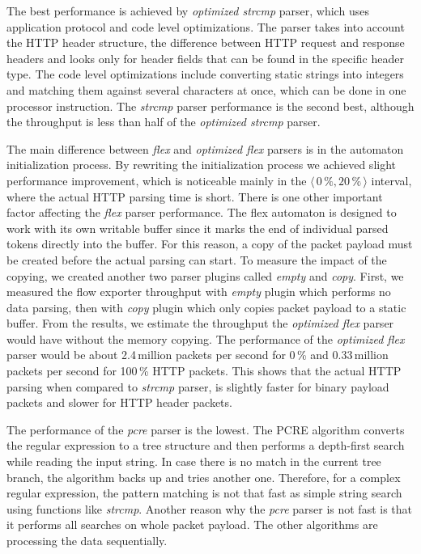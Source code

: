The best performance is achieved by \emph{optimized strcmp} parser, which uses application protocol and code level optimizations. The parser takes into account the HTTP header structure, the difference between HTTP request and response headers and looks only for header fields that can be found in the specific header type. The code level optimizations include converting static strings into integers and matching them against several characters at once, which can be done in one processor instruction. The \emph{strcmp} parser performance is the second best, although the throughput is less than half of the \emph{optimized strcmp} parser.

The main difference between \emph{flex} and \emph{optimized flex} parsers is in the automaton initialization process. By rewriting the initialization process we achieved slight performance improvement, which is noticeable mainly in the $\langle\,0\,\%,20\,\%\,\rangle$ interval, where the actual HTTP parsing time is short. There is one other important factor affecting the \emph{flex} parser performance. The flex automaton is designed to work with its own writable buffer since it marks the end of individual parsed tokens directly into the buffer. For this reason, a copy of the packet payload must be created before the actual parsing can start. To measure the impact of the copying, we created another two parser plugins called \emph{empty} and \emph{copy}. First, we measured the flow exporter throughput with \emph{empty} plugin which performs no data parsing, then with \emph{copy} plugin which only copies packet payload to a static buffer. From the results, we estimate the throughput the \emph{optimized flex} parser would have without the memory copying. The performance of the \emph{optimized flex} parser would be about 2.4\,million packets per second for 0\,\% and 0.33\,million packets per second for 100\,\% HTTP packets. This shows that the actual HTTP parsing when compared to \emph{strcmp} parser, is slightly faster for binary payload packets and slower for HTTP header packets.

The performance of the \emph{pcre} parser is the lowest. The PCRE algorithm converts the regular expression to a tree structure and then performs a depth-first search while reading the input string. In case there is no match in the current tree branch, the algorithm backs up and tries another one. Therefore, for a complex regular expression, the pattern matching is not that fast as simple string search using functions like \emph{strcmp}. Another reason why the \emph{pcre} parser is not fast is that it performs all searches on whole packet payload. The other algorithms are processing the data sequentially.

